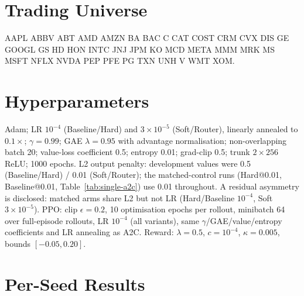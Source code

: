 \documentclass[sigconf,anonymous,review]{acmart}
\begin{document}
\section{Trading Universe}
\label{app:universe}
AAPL ABBV ABT AMD AMZN BA BAC C CAT COST CRM CVX DIS GE GOOGL GS HD HON
INTC JNJ JPM KO MCD META MMM MRK MS MSFT NFLX NVDA PEP PFE PG TXN UNH V
WMT XOM.

\section{Hyperparameters}
\label{app:hyper}
Adam; LR $10^{-4}$ (Baseline/Hard) and $3\times10^{-5}$ (Soft/Router),
linearly annealed to $0.1\times$; $\gamma{=}0.99$; GAE $\lambda{=}0.95$
with advantage normalisation; non-overlapping batch 20; value-loss
coefficient 0.5; entropy 0.01; grad-clip 0.5; trunk $2\times256$ ReLU;
1000 epochs. L2 output penalty: development values were 0.5
(Baseline/Hard) / 0.01 (Soft/Router); the matched-control runs
(Hard@0.01, Baseline@0.01, Table~\ref{tab:single-a2c}) use 0.01
throughout. A residual asymmetry is disclosed: matched arms share
L2 but not LR (Hard/Baseline $10^{-4}$, Soft $3\times10^{-5}$). PPO: clip $\epsilon{=}0.2$, 10 optimisation epochs per rollout,
minibatch 64 over full-episode rollouts, LR $10^{-4}$ (all variants),
same $\gamma$/GAE/value/entropy coefficients and LR annealing as A2C.
Reward: $\lambda{=}0.5$, $c{=}10^{-4}$, $\kappa{=}0.005$, bounds
$[-0.05,0.20]$.

\section{Per-Seed Results}
\label{app:perseed}
\end{document}
